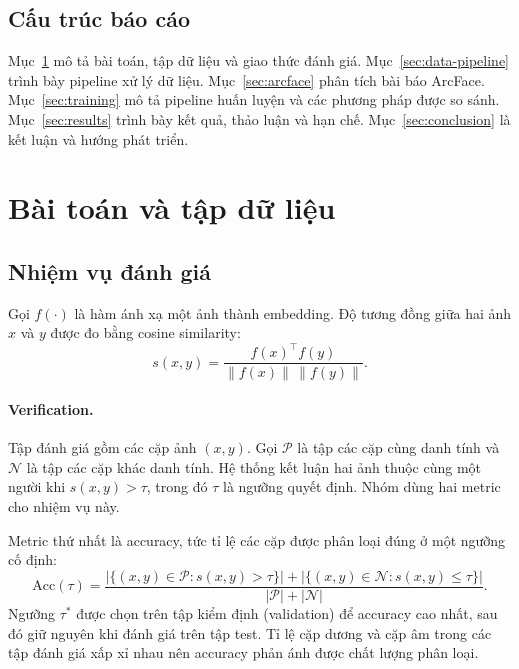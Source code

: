 \documentclass[a4paper,12pt]{article}
\begin{document}
\subsection{Cấu trúc báo cáo}
Mục~\ref{sec:data} mô tả bài toán, tập dữ liệu và giao thức đánh giá. Mục~\ref{sec:data-pipeline} trình bày pipeline xử lý dữ liệu. Mục~\ref{sec:arcface} phân tích bài báo ArcFace. Mục~\ref{sec:training} mô tả pipeline huấn luyện và các phương pháp được so sánh. Mục~\ref{sec:results} trình bày kết quả, thảo luận và hạn chế. Mục~\ref{sec:conclusion} là kết luận và hướng phát triển.

\section{Bài toán và tập dữ liệu}\label{sec:data}

\subsection{Nhiệm vụ đánh giá}
Gọi $f(\cdot)$ là hàm ánh xạ một ảnh thành embedding. Độ tương đồng giữa hai ảnh $x$ và $y$ được đo bằng cosine similarity:
\begin{equation}
    s(x,y) = \frac{f(x)^\top f(y)}{\lVert f(x)\rVert \, \lVert f(y)\rVert}.
\end{equation}

\paragraph{Verification.} Tập đánh giá gồm các cặp ảnh $(x,y)$. Gọi $\mathcal{P}$ là tập các cặp cùng danh tính và $\mathcal{N}$ là tập các cặp khác danh tính. Hệ thống kết luận hai ảnh thuộc cùng một người khi $s(x,y) > \tau$, trong đó $\tau$ là ngưỡng quyết định. Nhóm dùng hai metric cho nhiệm vụ này.

Metric thứ nhất là accuracy, tức tỉ lệ các cặp được phân loại đúng ở một ngưỡng cố định:
\begin{equation}
    \mathrm{Acc}(\tau) = \frac{\bigl|\{(x,y)\in\mathcal{P} : s(x,y) > \tau\}\bigr| + \bigl|\{(x,y)\in\mathcal{N} : s(x,y) \le \tau\}\bigr|}{|\mathcal{P}| + |\mathcal{N}|}.
\end{equation}
Ngưỡng $\tau^\ast$ được chọn trên tập kiểm định (validation) để accuracy cao nhất, sau đó giữ nguyên khi đánh giá trên tập test. Tỉ lệ cặp dương và cặp âm trong các tập đánh giá xấp xỉ nhau nên accuracy phản ánh được chất lượng phân loại.
\end{document}
